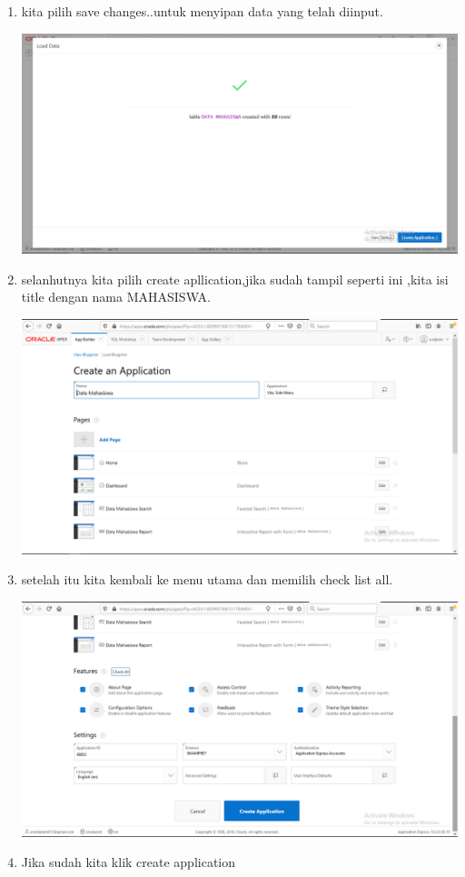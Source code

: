 \documentclass{article}
\begin{document}
\begin{enumerate}
    \item kita pilih save changes..untuk menyipan data yang telah diinput.
    \begin{center}
    \includegraphics[width=.8\textwidth]{tb9.PNG}
\end{center}
    \item selanhutnya kita pilih create apllication,jika sudah tampil seperti ini ,kita isi title dengan nama MAHASISWA.
    \begin{center}
    \includegraphics[width=.8\textwidth]{tb11.PNG}
\end{center}
    \item setelah itu kita kembali ke menu utama dan memilih check list all.
    \begin{center}
    \includegraphics[width=.8\textwidth]{tb12.PNG}
\end{center}
    \item Jika sudah kita klik create application

\end{enumerate}
\end{document}
